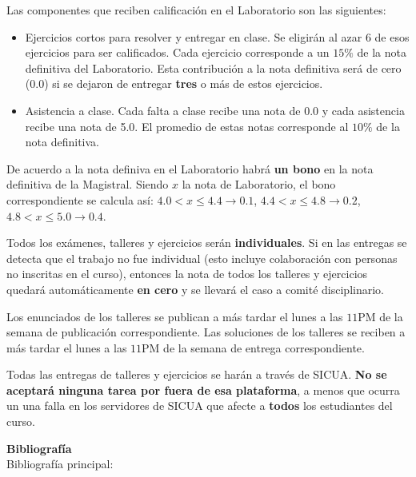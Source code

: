 \documentclass[letterpaper,10pt,onecolumn]{article}
\begin{document}
Las componentes que reciben calificaci\'on en el Laboratorio son las
siguientes:
\begin{itemize}
\item
Ejercicios cortos para resolver  y entregar en
clase.  
Se eligir\'an al azar 6 de esos ejercicios para ser calificados. 
Cada ejercicio corresponde a un $15\%$ de la nota definitiva del
Laboratorio. 
Esta contribuci\'on a la nota definitiva ser\'a de cero (0.0) si se
dejaron de entregar {\bf tres} o m\'as de estos ejercicios. 
\item
Asistencia a clase. Cada falta a clase recibe una nota de 0.0 y cada
asistencia recibe una nota de 5.0. El promedio de estas notas
corresponde al $10\%$ de la nota definitiva.
\end{itemize}

De acuerdo a la nota definiva en el Laboratorio habr\'a {\bf un bono} en la
nota definitiva de la Magistral. 
Siendo $x$ la nota de Laboratorio, el bono correspondiente
se calcula as\'i:
$4.0 < x \leq 4.4 \rightarrow 0.1$, $4.4< x\leq 4.8\rightarrow 0.2$, $4.8<x
\leq 5.0\rightarrow 0.4$.

Todos los ex\'amenes, talleres y ejercicios ser\'an
\textbf{individuales}.  
Si en las entregas se detecta que el trabajo no fue
individual (esto incluye colaboraci\'on con personas no inscritas en
el curso), entonces la nota de todos los talleres y ejercicios quedar\'a
autom\'aticamente {\bf en cero} y se llevar\'a el caso a comit\'e
disciplinario. 

Los enunciados de los talleres se publican a m\'as tardar el lunes a
las $11$PM de la semana de publicaci\'on correspondiente. 
Las soluciones de los talleres se reciben a m\'as tardar el lunes a
las $11$PM de la semana de entrega correspondiente.

Todas las entregas de talleres y ejercicios se har\'an a trav\'es de
SICUA.  {\bf No se aceptar\'a ninguna tarea por fuera de esa
  plataforma}, a menos que ocurra un una falla en los servidores de
SICUA que afecte a {\bf todos} los estudiantes del curso.



\noindent\textbf{\large {} \quad
  Bibliograf\'ia}\\[-0.2cm] 



\noindent\normalsize Bibliograf\'ia principal:
\end{document}
